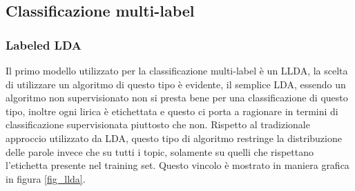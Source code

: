 \documentclass[technote]{IEEEtran}
\begin{document}
\subsection{Classificazione multi-label}
\subsubsection{Labeled LDA}
Il primo modello utilizzato per la classificazione multi-label è un LLDA, la scelta di utilizzare un algoritmo di questo tipo è evidente, il semplice LDA, essendo un algoritmo non supervisionato non si presta bene per una classificazione di questo tipo, inoltre ogni lirica è etichettata e questo ci porta a ragionare in termini di classificazione supervisionata piuttosto che non. Rispetto al tradizionale approccio utilizzato da LDA, questo tipo di algoritmo restringe la distribuzione delle parole invece che su tutti i topic, solamente su quelli che rispettano l'etichetta presente nel training set. Questo vincolo è mostrato in maniera grafica in figura \ref{fig_llda}.
\end{document}

